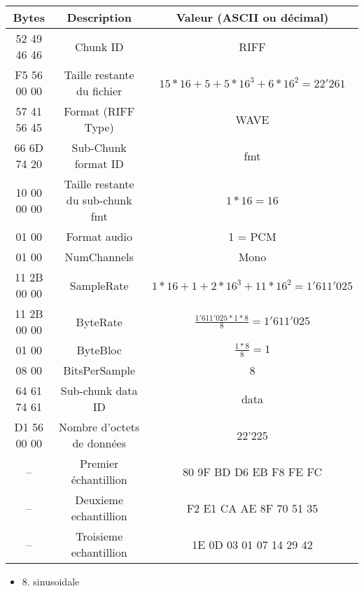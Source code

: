 \documentclass[a4paper, 12pt]{article}
\begin{document}
\begin{tabular}{|c|c|c|}
  \hline
    Bytes & Description & Valeur (ASCII ou décimal) \\
  \hline
    52 49 46 46 & Chunk ID & RIFF \\
    F5 56 00 00 & Taille restante du fichier & $15 * 16 + 5 + 5 * 16^{3} + 6 * 16^{2} = 22'261$\\
    57 41 56 45 & Format (RIFF Type) & WAVE \\
    66 6D 74 20 & Sub-Chunk format ID & fmt \\
    10 00 00 00 & Taille restante du sub-chunk fmt & $1 * 16 = 16$ \\
    01 00 & Format audio & 1 = PCM \\
    01 00 & NumChannels & Mono \\
    11 2B 00 00 & SampleRate & $1 * 16 + 1 + 2 * 16^{3} + 11 * 16^{2} = 1'611'025$ \\
    11 2B 00 00 & ByteRate & $ \frac{1'611'025 * 1 *  8}{8} = 1'611'025$\\
    01 00 & ByteBloc & $\frac{1 * 8}{8} = 1$\\
    08 00 & BitsPerSample & 8 \\
    64 61 74 61 & Sub-chunk data ID & data \\
    D1 56 00 00 & Nombre d'octets de données & 22'225 \\
    -- & Premier échantillion & 80 9F BD D6 EB F8 FE FC \\
    -- & Deuxieme echantillion & F2 E1 CA AE 8F 70 51 35 \\
    -- & Troisieme echantillion & 1E 0D 03 01 07 14 29 42 \\
  \hline
\end{tabular}
\begin{itemize}
    \item 8. sinusoidale

\end{itemize}
\end{document}

